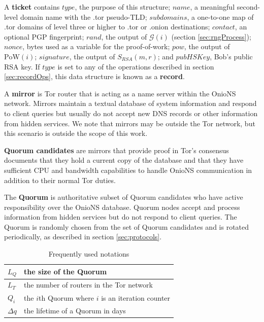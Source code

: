 \documentclass[USenglish,oneside,twocolumn]{article}
\begin{document}
A \textbf{ticket} contains $ \mathit{type} $, the purpose of this structure; $ \mathit{name} $, a meaningful second-level domain name with the .tor pseudo-TLD; $ \mathit{subdomains} $, a one-to-one map of .tor domains of level three or higher to .tor or .onion destinations; $ \mathit{contact} $, an optional PGP fingerprint; $ \mathit{rand} $, the output of $ \mathcal{G}(i) $ (section \ref{sec:rngProcess}); $ \mathit{nonce} $, bytes used as a variable for the proof-of-work; $ \mathit{pow} $, the output of $ \mathrm{PoW}(i) $; $ \mathit{signature} $, the output of $ S_{\mathit{RSA}}(m, r) $; and $ \mathit{pubHSKey} $, Bob's public RSA key. If $ \mathit{type} $ is set to any of the operations described in section \ref{sec:recordOps}, this data structure is known as a \textbf{record}.

A \textbf{mirror} is Tor router that is acting as a name server within the OnioNS network. Mirrors maintain a textual database of system information and respond to client queries but usually do not accept new DNS records or other information from hidden services. We note that mirrors may be outside the Tor network, but this scenario is outside the scope of this work.

\textbf{Quorum candidates} are mirrors that provide proof in Tor's consensus documents that they hold a current copy of the database and that they have sufficient CPU and bandwidth capabilities to handle OnioNS communication in addition to their normal Tor duties.

The \textbf{Quorum} is authoritative subset of Quorum candidates who have active responsibility over the OnioNS database. Quorum nodes accept and process information from hidden services but do not respond to client queries. The Quorum is randomly chosen from the set of Quorum candidates and is rotated periodically, as described in section \ref{sec:protocols}.

\renewcommand{\arraystretch}{1.2}
\begin{table}[h]
	\small
	\begin{tabularx}{\linewidth}{ | l | X | }
		\hline
    	$ L_{Q} $ & the size of the Quorum \\ \hline
    	$ L_{T} $ & the number of routers in the Tor network \\ \hline
    	$ Q_{i} $ & the $ i $th Quorum where $ i $ is an iteration counter \\ \hline
    	$ \Delta q $ & the lifetime of a Quorum in days \\ \hline
  	\end{tabularx}
  	\vspace{6pt}
  	\caption{Frequently used notations}
\end{table}
\end{document}
